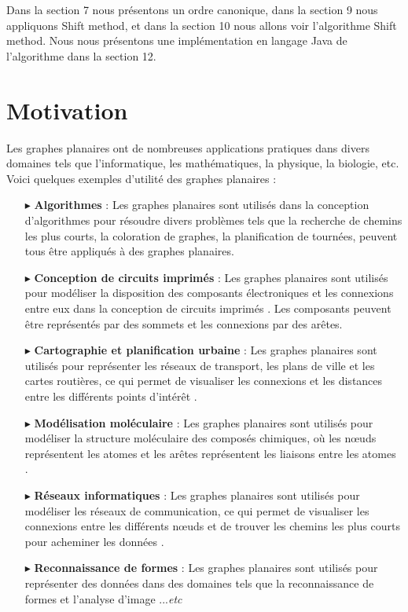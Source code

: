 \documentclass[hidelinks,letterpaper,12pt]{article}
\begin{document}
\\ \\
Dans la section 7 nous présentons un ordre canonique, dans la section 9 nous appliquons Shift method, et dans la section 10 nous allons voir l'algorithme Shift method. Nous nous présentons une implémentation en langage Java de l'algorithme dans la section 12. 	

\newpage
\section{Motivation}
Les graphes planaires ont de nombreuses applications pratiques dans divers domaines tels que l'informatique, les mathématiques, la physique, la biologie, etc. Voici quelques exemples d'utilité des graphes planaires :
\bigbreak  
\begin{itemize}
\item[$\blacktriangleright$] \textbf{Algorithmes} : Les graphes planaires sont utilisés dans la conception d'algorithmes pour résoudre divers problèmes tels que la recherche de chemins les plus courts, la coloration de graphes, la planification de tournées, peuvent tous être appliqués à des graphes planaires.
\\			
\item[$\blacktriangleright$] \textbf{Conception de circuits imprimés} : Les graphes planaires sont utilisés pour modéliser la disposition des composants électroniques et les connexions entre eux dans la conception de circuits imprimés \citep{Freeman}. Les composants peuvent être représentés par des sommets et les connexions par des arêtes.
\\			
\item[$\blacktriangleright$] \textbf{Cartographie et planification urbaine} : Les graphes planaires sont utilisés pour représenter les réseaux de transport, les plans de ville et les cartes routières, ce qui permet de visualiser les connexions et les distances entre les différents points d'intérêt \citep{BattistaTamassia}. 			
\\		
\item[$\blacktriangleright$] \textbf{Modélisation moléculaire} : Les graphes planaires sont utilisés pour modéliser la structure moléculaire des composés chimiques, où les nœuds représentent les atomes et les arêtes représentent les liaisons entre les atomes 
\citep{TodeschiniConsonni}.		
\\						
\item[$\blacktriangleright$] \textbf{Réseaux informatiques} : Les graphes planaires sont utilisés pour modéliser les réseaux de communication, ce qui permet de visualiser les connexions entre les différents nœuds et de trouver les chemins les plus courts pour acheminer les données \citep{Wang}. 			
\\		
\item[$\blacktriangleright$] \textbf{Reconnaissance de formes} : Les graphes planaires sont utilisés pour représenter des données dans des domaines tels que la reconnaissance de formes et l'analyse d'image \citep{BalakrishnanRanganathan}...\textit{etc}


\end{itemize}
\end{document}
